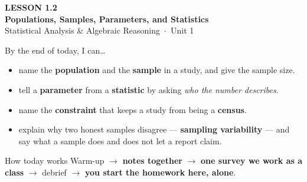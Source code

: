 \documentclass[aspectratio=169, 11pt]{beamer}
\begin{document}
{
\begin{frame}[plain]
  \vspace{2.8cm}\hspace{0.55cm}%
  \begin{minipage}{0.9\textwidth}
    {\color{goldacc}\bfseries\small LESSON 1.2}\\[0.5cm]
    {\color{white}\bfseries\LARGE Populations, Samples, Parameters, and Statistics}\\[1.2cm]
    {\color{frostmid}\small Statistical Analysis \& Algebraic Reasoning~$\cdot$~Unit 1}
  \end{minipage}
\end{frame}
}

\begin{frame}[t, plain]
  By the end of today, I can\ldots
  \begin{itemize}\setlength{\itemsep}{5pt}
    \item name the \textbf{population} and the \textbf{sample} in a study, and give the sample size.
    \item tell a \textbf{parameter} from a \textbf{statistic} by asking \emph{who the number
          describes}.
    \item name the \textbf{constraint} that keeps a study from being a \textbf{census}.
    \item explain why two honest samples disagree --- \textbf{sampling variability} --- and say
          what a sample does and does not let a report claim.
  \end{itemize}
  \begin{block}{How today works}
    Warm-up $\to$ \textbf{notes together} $\to$ \textbf{one survey we work as a class} $\to$
    debrief $\to$ \textbf{you start the homework here, alone}.
  \end{block}
\end{frame}
\end{document}

